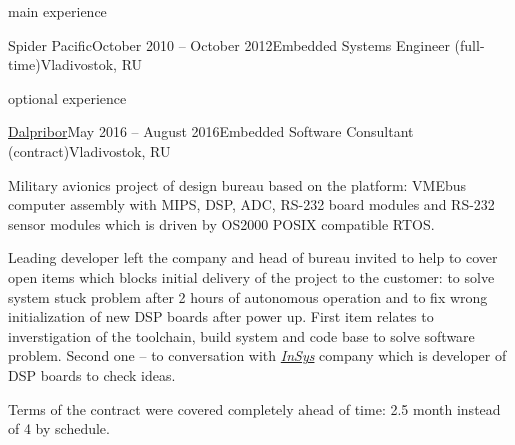 \documentclass{template}
\begin{document}
\begin{rSection}{main experience}
\begin{rCompany}{Spider Pacific}{October 2010 -- October 2012}{Embedded Systems Engineer (full-time)}{Vladivostok, RU}
\end{rCompany}
\end{rSection}


\begin{rSection}{optional experience}
\begin{rCompany}{\href{http://dalpribor.ru}{Dalpribor}}{May 2016 -- August 2016}{Embedded Software Consultant (contract)}{Vladivostok, RU}

\item Military avionics project of design bureau based on the  platform: VMEbus computer assembly with MIPS, DSP, ADC, RS-232
      board modules and RS-232 sensor modules which is driven by OS2000 POSIX compatible RTOS.
\item Leading developer left the company and head of bureau invited to help to cover open items which blocks initial delivery of the project to
      the customer: to solve system stuck problem after 2 hours of autonomous operation and to fix wrong initialization of new DSP boards after
      power up. First item relates to inverstigation of the toolchain, build system and code base to solve software problem. Second one -- to conversation
      with \href{http://www.insys.ru}{\textit{InSys}} company which is developer of DSP boards to check ideas.
\item Terms of the contract were covered completely ahead of time: 2.5 month instead of 4 by schedule.

\end{rCompany}
\end{rSection}

\end{document}
